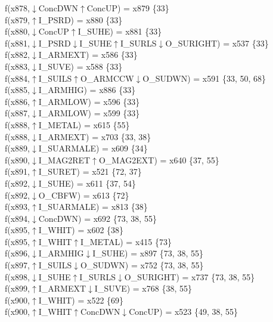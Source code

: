 f(x878,$\downarrow$ConcDWN$\uparrow$ConcUP) = x879 \{33\} \\  
f(x879,$\uparrow$I\_PSRD) = x880 \{33\} \\  
f(x880,$\downarrow$ConcUP$\uparrow$I\_SUHE) = x881 \{33\} \\  
f(x881,$\downarrow$I\_PSRD$\downarrow$I\_SUHE$\uparrow$I\_SURLS$\downarrow$O\_SURIGHT) = x537 \{33\} \\  
f(x882,$\downarrow$I\_ARMEXT) = x586 \{33\} \\  
f(x883,$\downarrow$I\_SUVE) = x588 \{33\} \\  
f(x884,$\uparrow$I\_SUILS$\uparrow$O\_ARMCCW$\downarrow$O\_SUDWN) = x591 \{33, 50, 68\} \\  
f(x885,$\downarrow$I\_ARMHIG) = x886 \{33\} \\  
f(x886,$\uparrow$I\_ARMLOW) = x596 \{33\} \\  
f(x887,$\downarrow$I\_ARMLOW) = x599 \{33\} \\  
f(x888,$\uparrow$I\_METAL) = x615 \{55\} \\  
f(x888,$\downarrow$I\_ARMEXT) = x703 \{33, 38\} \\  
f(x889,$\downarrow$I\_SUARMALE) = x609 \{34\} \\  
f(x890,$\downarrow$I\_MAG2RET$\uparrow$O\_MAG2EXT) = x640 \{37, 55\} \\  
f(x891,$\uparrow$I\_SURET) = x521 \{72, 37\} \\  
f(x892,$\downarrow$I\_SUHE) = x611 \{37, 54\} \\  
f(x892,$\downarrow$O\_CBFW) = x613 \{72\} \\  
f(x893,$\uparrow$I\_SUARMALE) = x813 \{38\} \\  
f(x894,$\downarrow$ConcDWN) = x692 \{73, 38, 55\} \\  
f(x895,$\uparrow$I\_WHIT) = x602 \{38\} \\  
f(x895,$\uparrow$I\_WHIT$\uparrow$I\_METAL) = x415 \{73\} \\  
f(x896,$\downarrow$I\_ARMHIG$\downarrow$I\_SUHE) = x897 \{73, 38, 55\} \\  
f(x897,$\uparrow$I\_SUILS$\downarrow$O\_SUDWN) = x752 \{73, 38, 55\} \\  
f(x898,$\downarrow$I\_SUHE$\uparrow$I\_SURLS$\downarrow$O\_SURIGHT) = x737 \{73, 38, 55\} \\  
f(x899,$\uparrow$I\_ARMEXT$\downarrow$I\_SUVE) = x768 \{38, 55\} \\  
f(x900,$\uparrow$I\_WHIT) = x522 \{69\} \\  
f(x900,$\uparrow$I\_WHIT$\uparrow$ConcDWN$\downarrow$ConcUP) = x523 \{49, 38, 55\} \\  

